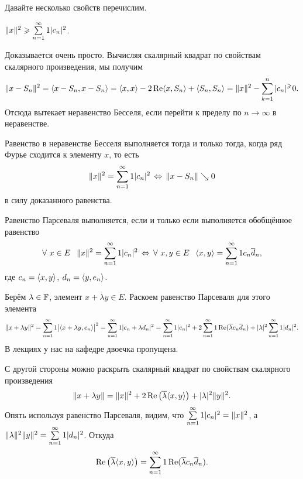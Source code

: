 Давайте несколько свойств перечислим.
\begin{Ut}
	$\|x\|^2\geqslant \sum\limits_{{n}={1}}^\infty1|c_n|^2$.
\end{Ut}
\begin{Proof}
	Доказывается очень просто. Вычисляя скалярный квадрат по свойствам скалярного произведения, мы получим
	\[
		\|x-S_n\|^2 = \langle x-S_n,x-S_n\rangle = \langle x,x\rangle - 2\mathop{\text{Re}}\langle x,S_n\rangle + \langle S_n,S_n\rangle = 
		\|x\|^2 - \sum\limits_{k = 1}^{n}|c_n|^\geqslant0.
	\]
	Отсюда вытекает неравенство Бесселя, если перейти к пределу по $n\to\infty$ в неравенстве.
\end{Proof}
\begin{Ut}
	Равенство в неравенстве Бесселя выполняется тогда и только тогда, когда ряд Фурье сходится к элементу $x$, то есть
	\[
		\|x\|^2 = \sum\limits_{{n}={1}}^\infty1|c_n|^2\,\Leftrightarrow\, \|x-S_n\|\searrow0
	\]
	в силу доказанного равенства.
\end{Ut}
\begin{Ut}
	Равенство Парсеваля выполняется, если и только если выполняется обобщённое равенство
	\[
		\forall\ x\in E\pau \|x\|^2 = \rY n1|c_n|^2\iff \forall\ x,y\in E\pau \la x,y\ra = \rY n1 c_n\ol d_n,
	\]
	где $c_n = \langle x,y\rangle$, $d_n = \langle y,e_n\rangle$.
\end{Ut}
\begin{Proof}
	Берём $\lambda\in \mathbb F$, элемент $x +\lambda y\in E$. Раскоем равенство Парсеваля для этого элемента
	\[
		\|x+\lambda y\|^2 = \sum\limits_{{n}={1}}^\infty1\big|\langle x+\lambda y,e_n\rangle\big|^2 = \sum\limits_{{n}={1}}^\infty1|c_n+\lambda d_n|^2 = 
		\sum\limits_{{n}={1}}^\infty1|c_n|^2 + 2\sum\limits_{{n}={1}}^\infty1\mathop{\text{Re}} (\overline{\lambda} c_n\overline{d}_n) + |\lambda|^2\sum\limits_{{n}={1}}^\infty1|d_n|^2.
	\]
	В лекциях у нас на кафедре двоечка пропущена.

	С другой стороны можно раскрыть скалярный квадрат по свойствам скалярного произведения
	\[
		\|x+\lambda y\| = \|x\|^2 + 2\mathop{\text{Re}}\big(\overline{\lambda}\langle x,y\rangle\big) + |\lambda|^2\|y\|^2.
	\]
	Опять используя равенство Парсеваля, видим, что $\sum\limits_{{n}={1}}^\infty1|c_n|^2 = \|x\|^2$, а $\|\lambda\|^2\|y\|^2 = \sum\limits_{{n}={1}}^\infty1|d_n|^2$.
	Откуда
	\[
		\mathop{\text{Re}}\big(\overline{\lambda}\langle x,y\rangle\big) = \sum\limits_{{n}={1}}^\infty1\mathop{\text{Re}}(\overline{\lambda} c_n\overline{d}_n).
	\]
\end{Proof}

